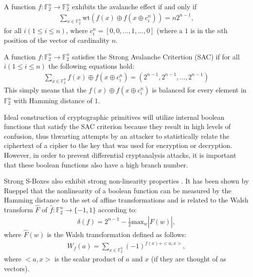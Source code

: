 \documentclass[11pt]{article}
\newcommand{\field}[1]{\mathbb{#1}} %
\begin{document}
\begin{define}
A function $f : \field{F}_2^n \to \field{F}_2^n$ exhibits the avalanche effect if and only if 
\begin{eqnarray*}
\sum_{x \in \field{F}_2^n} \text{wt}(f(x) \oplus f(x \oplus c_{i}^{n})) = n2^{n-1},
\end{eqnarray*}
for all $i (1 \leq i \leq n)$, where $c_{i}^{n} = [0, 0, ..., 1, ..., 0]$ (where a $1$ is in the $n$th position of the vector of cardinality $n$.
\end{define}

\begin{define}
A function $f : \field{F}_2^n \to \field{F}_2^n$ satisfies the Strong Avalanche Critertion (SAC) if for all $i (1 \leq i \leq n)$ the following equations hold:
\begin{eqnarray*}
\sum_{x \in \field{F}_2^n} f(x) \oplus f(x \oplus c_i^n) = (2^{n-1}, 2^{n-1}, ..., 2^{n-1})
\end{eqnarray*}
This simply means that the $f(x) \oplus f(x \oplus c_i^n)$ is balanced for every element in $\field{F}_2^n$ with Hamming distance of $1$. 
\end{define}

Ideal construction of cryptographic primitives will utilize internal boolean functions that satisfy the SAC criterion because they result in high levels of confusion, thus thwarting attempts by an attacker to statistically relate the ciphertext of a cipher to the key that was used for encryption or decryption. However, in order to prevent differential cryptanalysis attacks, it is important that these boolean functions also have a high branch number.

Strong S-Boxes also exhibit strong non-linearity properties \cite{Kim90astudy}. It has been shown by Rueppel that the nonlinearity of a boolean function can be measured by the Hamming distance to the set of affine transformations and is related to the Walsh transform $\hat{F}$ of $\hat{f} : \field{F}_2^n \to \{-1, 1\}$ according to:
\begin{eqnarray*}
\delta(f)  = 2^{n-1} - \frac{1}{2}\text{max}_w|\hat{F}(w)|,
\end{eqnarray*}
where $\hat{F}(w)$ is the Walsh transformation defined as follows:
\begin{eqnarray*}
W_f(a) = \sum_{x \in \field{F}_2^n} (-1)^{f(x) + <a,x>},
\end{eqnarray*}
where $<a,x>$ is the scalar product of $a$ and $x$ (if they are thought of as vectors).
\end{document}
